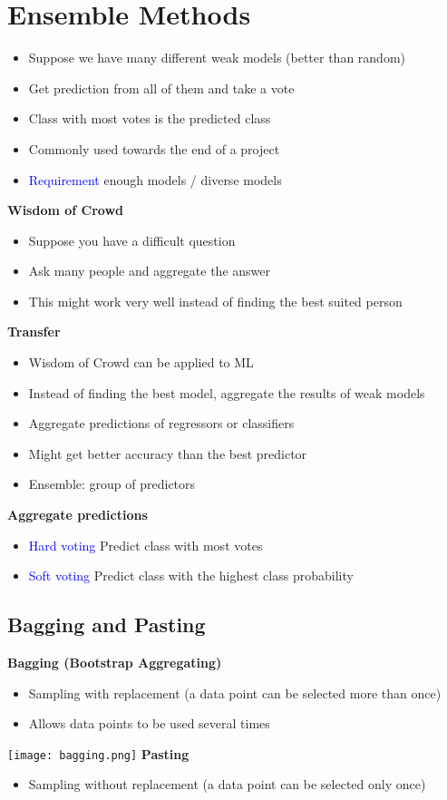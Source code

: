 \section{Ensemble Methods}
\begin{itemize}
    \item Suppose we have many different weak models (better than random)
    \item Get prediction from all of them and take a vote
    \item Class with most votes is the predicted class
    \item Commonly used towards the end of a project
    \item \textcolor{blue}{Requirement} enough models / diverse models
\end{itemize}

\textbf{Wisdom of Crowd}
\begin{itemize}
    \item Suppose you have a difficult question
    \item Ask many people and aggregate the answer
    \item This might work very well instead of finding the best suited person
\end{itemize}

\textbf{Transfer}
\begin{itemize}
    \item Wisdom of Crowd can be applied to ML
    \item Instead of finding the best model, aggregate the results of weak models
    \item Aggregate predictions of regressors or classifiers
    \item Might get better accuracy than the best predictor
    \item Ensemble: group of predictors
\end{itemize}

\textbf{Aggregate predictions}
\begin{itemize}
    \item \textcolor{blue}{Hard voting} Predict class with most votes
    \item \textcolor{blue}{Soft voting} Predict class with the highest class probability
\end{itemize}


\subsection{Bagging and Pasting}
\textbf{Bagging (Bootstrap Aggregating)}
\begin{itemize}
    \item Sampling with replacement (a data point can be selected more than once)
    \item Allows data points to be used several times
\end{itemize}
\texttt{[image: bagging.png]}
\textbf{Pasting}
\begin{itemize}
    \item Sampling without replacement (a data point can be selected only once)
\end{itemize}

